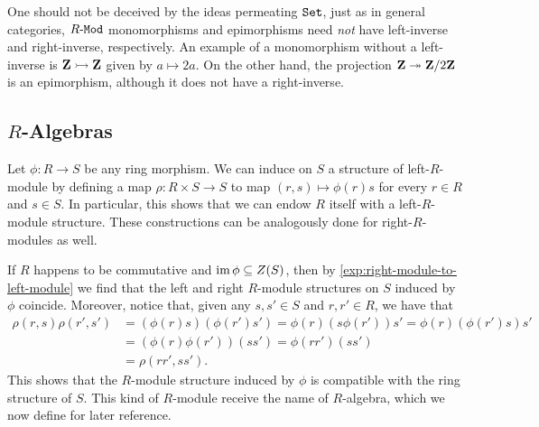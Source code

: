 \begin{example}
    \label{exp:right-left-inverse-monic-epic}
    One should not be deceived by the ideas permeating \({\texttt{Set}}\), just as in general
    categories, \({R\text{-}\texttt{Mod}}\) monomorphisms and epimorphisms need \emph{not} have
    left-inverse and right-inverse, respectively. An example of a monomorphism
    without a left-inverse is \(\mathbf{Z} \rightarrowtail \mathbf{Z}\) given by \(a \mapsto 2 a\). On the
    other hand, the projection \(\mathbf{Z} \twoheadrightarrow \mathbf{Z}/2\mathbf{Z}\) is an epimorphism, although it
    does not have a right-inverse.
\end{example}


\subsection{\texorpdfstring{\(R\)}{R}-Algebras}

\begin{example}
    \label{exp:R-modules-induced-by-ring-morphism}
    Let \(\phi: R \to S\) be any ring morphism. We can induce on \(S\) a structure
    of left-\(R\)-module by defining a map \(\rho: R \times S \to S\) to map
    \((r, s) \mapsto \phi(r) s\) for every \(r \in R\) and \(s \in S\). In
    particular, this shows that we can endow \(R\) itself with a left-\(R\)-module
    structure. These constructions can be analogously done for right-\(R\)-modules
    as well.

    If \(R\) happens to be commutative and \(\operatorname{im} \phi \subseteq Z(S)\), then by
    \cref{exp:right-module-to-left-module} we find that the left and right
    \(R\)-module structures on \(S\) induced by \(\phi\) coincide. Moreover, notice
    that, given any \(s, s' \in S\) and \(r, r' \in R\), we have that
    \begin{align*}
        \rho(r, s) \rho(r', s')
         & = (\phi(r) s) (\phi(r') s')
        = \phi(r) (s \phi(r')) s'
        = \phi(r) (\phi(r') s) s'      \\
         & = (\phi(r) \phi(r')) (s s')
        = \phi(r r') (s s')            \\
         & = \rho(r r', s s').
    \end{align*}
    This shows that the \(R\)-module structure induced by \(\phi\) is compatible
    with the ring structure of \(S\). This kind of \(R\)-module receive the
    name of \(R\)-algebra, which we now define for later reference.
\end{example}

